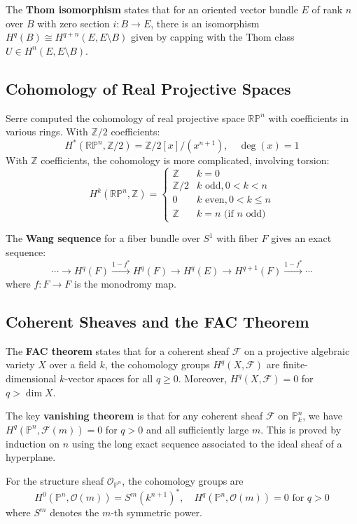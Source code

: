 The \textbf{Thom isomorphism} states that for an oriented vector bundle $E$ of rank $n$ over $B$ with zero section $i: B \to E$, there is an isomorphism $H^q(B) \cong H^{q+n}(E, E \setminus B)$ given by capping with the Thom class $U \in H^n(E, E \setminus B)$.

\subsection{Cohomology of Real Projective Spaces}

Serre computed the cohomology of real projective space $\mathbb{RP}^n$ with coefficients in various rings. With $\mathbb{Z}/2$ coefficients:
\[H^*(\mathbb{RP}^n, \mathbb{Z}/2) = \mathbb{Z}/2[x]/(x^{n+1}), \quad \deg(x) = 1\]
With $\mathbb{Z}$ coefficients, the cohomology is more complicated, involving torsion:
\[H^k(\mathbb{RP}^n, \mathbb{Z}) = \begin{cases} \mathbb{Z} & k = 0 \\ \mathbb{Z}/2 & k \text{ odd}, 0 < k < n \\ 0 & k \text{ even}, 0 < k \leq n \\ \mathbb{Z} & k = n \text{ (if } n \text{ odd)} \end{cases}\]

The \textbf{Wang sequence} for a fiber bundle over $S^1$ with fiber $F$ gives an exact sequence:
\[\cdots \to H^q(F) \xrightarrow{1 - f^*} H^q(F) \to H^q(E) \to H^{q+1}(F) \xrightarrow{1 - f^*} \cdots\]
where $f: F \to F$ is the monodromy map.

\subsection{Coherent Sheaves and the FAC Theorem}

The \textbf{FAC theorem} states that for a coherent sheaf $\mathcal{F}$ on a projective algebraic variety $X$ over a field $k$, the cohomology groups $H^q(X, \mathcal{F})$ are finite-dimensional $k$-vector spaces for all $q \geq 0$. Moreover, $H^q(X, \mathcal{F}) = 0$ for $q > \dim X$.

The key \textbf{vanishing theorem} is that for any coherent sheaf $\mathcal{F}$ on $\mathbb{P}^n_k$, we have $H^q(\mathbb{P}^n, \mathcal{F}(m)) = 0$ for $q > 0$ and all sufficiently large $m$. This is proved by induction on $n$ using the long exact sequence associated to the ideal sheaf of a hyperplane.

For the structure sheaf $\mathcal{O}_{\mathbb{P}^n}$, the cohomology groups are
\[H^0(\mathbb{P}^n, \mathcal{O}(m)) = S^m(k^{n+1})^*, \quad H^q(\mathbb{P}^n, \mathcal{O}(m)) = 0 \text{ for } q > 0\]
where $S^m$ denotes the $m$-th symmetric power.

